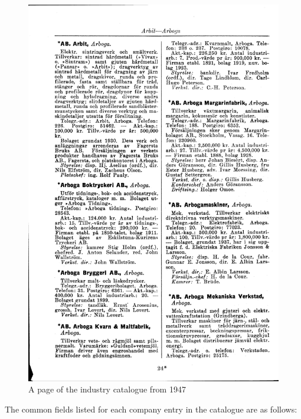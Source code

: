 \documentclass[
]{article}
\begin{document}
\begin{figure}

{\centering \includegraphics[width=6in,height=\textheight]{assets/svensk-industrikalender_1.png}

}

\caption{\label{fig-industry-calender}A page of the industry catalogue
from 1947}

\end{figure}

The common fields listed for each company entry in the catalogue are as
follows:
\end{document}
